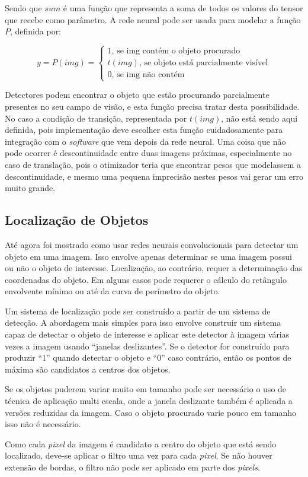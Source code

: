 Sendo que $sum$ é uma função que representa a soma de todos os valores do
tensor que recebe como parâmetro.
A rede neural pode ser usada para modelar a função $P$, definida por:

\begin{equation}
	y = P(img) = \begin{cases}
		1 \text{, se img contém o objeto procurado} \\
		t(img) \text{, se objeto está parcialmente visível} \\
		0 \text{, se img não contém}
	\end{cases}
\end{equation}

Detectores podem encontrar o objeto que estão procurando parcialmente presentes 
no seu campo de visão, e esta função precisa tratar desta possibilidade. No
caso a condição de transição, representada por $t(img)$, não está sendo
aqui definida, pois implementação deve escolher esta função cuidadosamente
para integração com o \emph{software} que vem depois da rede neural.
Uma coisa que não pode ocorrer é descontinuidade entre duas imagens próximas,
especialmente no caso de translação, pois o otimizador teria que encontrar
pesos que modelassem a descontinuidade, e mesmo uma pequena imprecisão nestes
pesos vai gerar um erro muito grande.

\subsection{Localização de Objetos} \label{sec:localiz_objetos}
Até agora foi mostrado como usar redes neurais convolucionais para detectar um
objeto em uma imagem. Isso envolve apenas determinar se uma imagem possui ou não
o objeto de interesse. Localização, ao contrário, requer a determinação das
coordenadas do objeto. Em alguns casos pode requerer o cálculo do retângulo
envolvente mínimo ou até da curva de perímetro do objeto.

Um sistema de localização pode ser construído a partir de um sistema de
detecção. A abordagem mais simples para isso envolve construir um sistema capaz
de detectar o objeto de interesse e aplicar este
detector à imagem várias vezes a imagem usando ``janelas deslizantes''.
Se o detector for construído para produzir ``1'' quando detectar o objeto e
“0” caso contrário, então os pontos de máxima são candidatos a centros dos
objetos.

Se os objetos puderem variar muito em tamanho pode ser necessário o uso de
técnica de aplicação multi escala, onde a janela deslizante também é aplicada a
versões reduzidas da imagem. Caso o objeto procurado varie pouco em tamanho
isso não é necessário.

Como cada \emph{pixel} da imagem é candidato a centro do objeto que está sendo
localizado, deve-se aplicar o filtro uma vez para cada \emph{pixel}. Se não
houver extensão de bordas, o filtro não pode ser aplicado em parte dos
\emph{pixels}.

